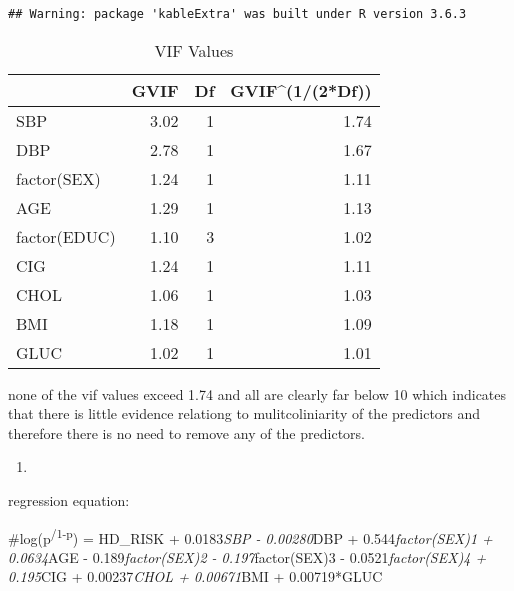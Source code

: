 \documentclass[
]{article}
\newenvironment{Shaded}{\begin{snugshade}}{\end{snugshade}}
\newcommand{\DataTypeTok}[1]{\textcolor[rgb]{0.13,0.29,0.53}{#1}}
\newcommand{\DecValTok}[1]{\textcolor[rgb]{0.00,0.00,0.81}{#1}}
\newcommand{\KeywordTok}[1]{\textcolor[rgb]{0.13,0.29,0.53}{\textbf{#1}}}
\newcommand{\NormalTok}[1]{#1}
\newcommand{\OperatorTok}[1]{\textcolor[rgb]{0.81,0.36,0.00}{\textbf{#1}}}
\newcommand{\StringTok}[1]{\textcolor[rgb]{0.31,0.60,0.02}{#1}}
\begin{document}
\begin{verbatim}
## Warning: package 'kableExtra' was built under R version 3.6.3
\end{verbatim}

\begin{Shaded}
\end{Shaded}

\begin{table}

\caption{\label{tab:unnamed-chunk-7}VIF Values}
\centering
\begin{tabular}[t]{l|r|r|r}
\hline
  & GVIF & Df & GVIF\textasciicircum{}(1/(2*Df))\\
\hline
SBP & 3.02 & 1 & 1.74\\
\hline
DBP & 2.78 & 1 & 1.67\\
\hline
factor(SEX) & 1.24 & 1 & 1.11\\
\hline
AGE & 1.29 & 1 & 1.13\\
\hline
factor(EDUC) & 1.10 & 3 & 1.02\\
\hline
CIG & 1.24 & 1 & 1.11\\
\hline
CHOL & 1.06 & 1 & 1.03\\
\hline
BMI & 1.18 & 1 & 1.09\\
\hline
GLUC & 1.02 & 1 & 1.01\\
\hline
\end{tabular}
\end{table}

none of the vif values exceed 1.74 and all are clearly far below 10
which indicates that there is little evidence relationg to
mulitcoliniarity of the predictors and therefore there is no need to
remove any of the predictors.

\begin{enumerate}
\def\labelenumi{\alph{enumi})}
\setcounter{enumi}{1}
\item
\end{enumerate}

regression equation:

\#log(p\textsuperscript{/1-p}) = HD\_RISK + 0.0183\emph{SBP -
0.00280}DBP + 0.544\emph{factor(SEX)1 + 0.0634}AGE -
0.189\emph{factor(SEX)2 - 0.197}factor(SEX)3 - 0.0521\emph{factor(SEX)4
+ 0.195}CIG + 0.00237\emph{CHOL + 0.00671}BMI + 0.00719*GLUC
\end{document}

